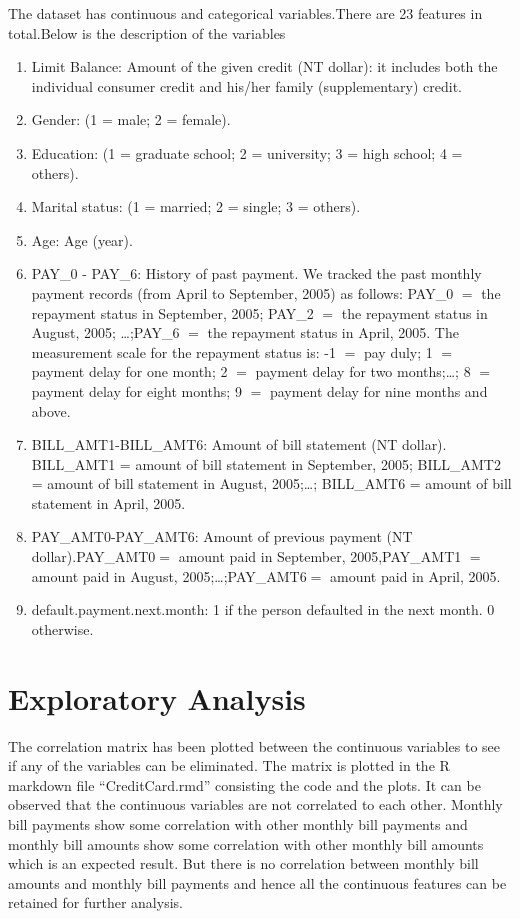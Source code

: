 \documentclass{article}
\begin{document}
 
The dataset has continuous and categorical variables.There are 23 features in total.Below is the description of the variables 
\begin{enumerate}[leftmargin=2cm,rightmargin=2cm]
\item Limit Balance: Amount of the given credit (NT dollar): it includes both the individual consumer credit and his/her family (supplementary) credit.
\item Gender: (1 = male; 2 = female).
\item Education:  (1 = graduate school; 2 = university; 3 = high school; 4 = others).
\item Marital status:  (1 = married; 2 = single; 3 = others). 
\item Age: Age (year).
\item PAY\_0 - PAY\_6:  History of past payment. We tracked the past monthly payment records (from April to September, 2005) as follows: PAY\_0 $=$ the repayment status in September, 2005; PAY\_2 $=$ the repayment status in August, 2005; \ldots;PAY\_6 $=$ the repayment status in April, 2005. The measurement scale for the repayment status is: -1 $=$ pay duly; 1 $=$ payment delay for one month; 2 $=$ payment delay for two months;\ldots; 8 $=$ payment delay for eight months; 9 $=$ payment delay for nine months and above.
\item BILL\_AMT1-BILL\_AMT6: Amount of bill statement (NT dollar). BILL\_AMT1 = amount of bill statement in September, 2005; BILL\_AMT2 = amount of bill statement in August, 2005;\ldots; BILL\_AMT6 = amount of bill statement in April, 2005.
 \item PAY\_AMT0-PAY\_AMT6: Amount of previous payment (NT dollar).PAY\_AMT0$=$ amount paid in September, 2005,PAY\_AMT1 $=$ amount paid in August, 2005;\ldots;PAY\_AMT6$=$ amount paid in April, 2005.
\item default.payment.next.month: 1 if the person defaulted in the next month. 0 otherwise.

\end{enumerate}

\section{Exploratory Analysis}

The correlation matrix has been plotted between the continuous variables to see if any of the variables can be eliminated. The matrix is plotted in the R markdown file “CreditCard.rmd”  consisting the code and the plots. It can be observed that the  continuous variables are not correlated to each other.  Monthly bill payments show some correlation with other monthly bill payments and monthly bill amounts show some correlation with other monthly bill amounts which is an expected result. But there is no correlation between monthly bill amounts and monthly bill payments and hence all the continuous features can be retained for further analysis.
\end{document}
